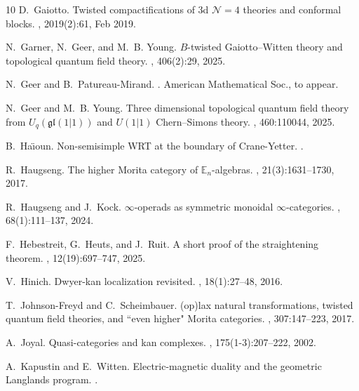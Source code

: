 \documentclass[reqno]{amsart}
\theoremstyle{definition}
\newcommand{\mfk}[1]{\mathfrak{#1}}
\renewcommand{\1}{\mathbf{1}}
\begin{document}
\begin{thebibliography}{10}
D.~Gaiotto.
\newblock Twisted compactifications of 3d $\mathcal{N}= 4$ theories and
  conformal blocks.
, 2019(2):61, Feb 2019.

N.~Garner, N.~Geer, and M.~B. Young.
\newblock ${B}$-twisted {G}aiotto--{W}itten theory and topological quantum
  field theory.
, 406(2):29, 2025.

N.~Geer and B.~Patureau-Mirand.
.
\newblock American Mathematical Soc., to appear.

N.~Geer and M.~B. Young.
\newblock Three dimensional topological quantum field theory from
  ${U}_q(\mfk{gl}(1|1))$ and ${U}(1|1)$ {C}hern--{S}imons theory.
, 460:110044, 2025.

B.~Ha{\"\i}oun.
\newblock Non-semisimple {WRT} at the boundary of {C}rane-{Y}etter.
.

R.~Haugseng.
\newblock The higher {M}orita category of $\mathbb{E}_n$-algebras.
, 21(3):1631--1730, 2017.

R.~Haugseng and J.~Kock.
\newblock $\infty$-operads as symmetric monoidal $\infty$-categories.
, 68(1):111--137, 2024.

F.~Hebestreit, G.~Heuts, and J.~Ruit.
\newblock A short proof of the straightening theorem.
, 12(19):697--747, 2025.

V.~Hinich.
\newblock Dwyer-kan localization revisited.
, 18(1):27--48, 2016.

T.~Johnson-Freyd and C.~Scheimbauer.
\newblock (op)lax natural transformations, twisted quantum field theories, and
  ``even higher" {M}orita categories.
, 307:147--223, 2017.

A.~Joyal.
\newblock Quasi-categories and kan complexes.
, 175(1-3):207--222, 2002.

A.~Kapustin and E.~Witten.
\newblock Electric-magnetic duality and the geometric {L}anglands program.
.


\end{thebibliography}
\end{document}

